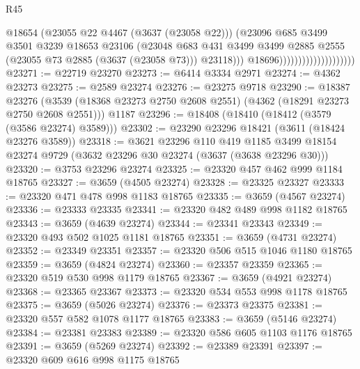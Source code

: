 \begin{lexlean}{R45}
\begin{coremodule}
                                              @18654
                                              (@23055 @22 @4467 (@3637 (@23058 @22)))
                                              (@23096
                                                @685
                                                @3499
                                                @3501
                                                @3239
                                                @18653
                                                @23106
                                                (@23048
                                                  @683
                                                  @431
                                                  @3499
                                                  @3499
                                                  @2885
                                                  @2555
                                                  (@23055 @73 @2885 (@3637 (@23058 @73)))
                                                  @23118)))
                                            @18696))))))))))))))))))))
@23271 := @22719 @23270
@23273 := @6414 @3334 @2971
@23274 := @4362 @23273
@23275 := @2589 @23274
@23276 := @23275 @9718
@23290 := @18387
    @23276
    (@3539 (@18368 @23273 @2750 @2608 @2551) (@4362 (@18291 @23273 @2750 @2608 @2551)))
    @1187
@23296 := @18408 (@18410 (@18412 (@3579 (@3586 @23274) @3589)))
@23302 := @23290 @23296 @18421 (@3611 (@18424 @23276 @3589))
@23318 := @3621
    @23296
    @110
    @419
    @1185
    @3499
    @18154
    @23274
    @9729
    (@3632 @23296 @30 @23274 (@3637 (@3638 @23296 @30)))
@23320 := @3753 @23296 @23274
@23325 := @23320 @457 @462 @999 @1184 @18765
@23327 := @3659 (@4505 @23274)
@23328 := @23325 @23327
@23333 := @23320 @471 @478 @998 @1183 @18765
@23335 := @3659 (@4567 @23274)
@23336 := @23333 @23335
@23341 := @23320 @482 @489 @998 @1182 @18765
@23343 := @3659 (@4639 @23274)
@23344 := @23341 @23343
@23349 := @23320 @493 @502 @1025 @1181 @18765
@23351 := @3659 (@4731 @23274)
@23352 := @23349 @23351
@23357 := @23320 @506 @515 @1046 @1180 @18765
@23359 := @3659 (@4824 @23274)
@23360 := @23357 @23359
@23365 := @23320 @519 @530 @998 @1179 @18765
@23367 := @3659 (@4921 @23274)
@23368 := @23365 @23367
@23373 := @23320 @534 @553 @998 @1178 @18765
@23375 := @3659 (@5026 @23274)
@23376 := @23373 @23375
@23381 := @23320 @557 @582 @1078 @1177 @18765
@23383 := @3659 (@5146 @23274)
@23384 := @23381 @23383
@23389 := @23320 @586 @605 @1103 @1176 @18765
@23391 := @3659 (@5269 @23274)
@23392 := @23389 @23391
@23397 := @23320 @609 @616 @998 @1175 @18765

\end{coremodule}
\end{lexlean}
